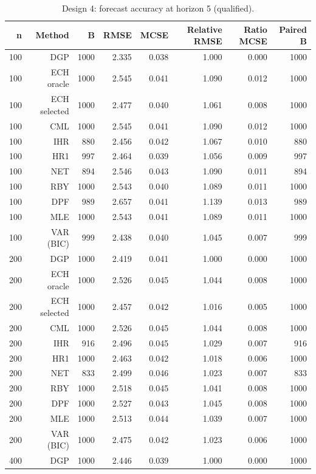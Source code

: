 \begin{table}[p]\centering
\caption{Design 4: forecast accuracy at horizon 5 (qualified).}
\small
\begin{tabular}{rrrrrrrr}\toprule
n & Method & B & RMSE & MCSE & Relative RMSE & Ratio MCSE & Paired B \\\midrule
100 & DGP & 1000 & 2.335 & 0.038 & 1.000 & 0.000 & 1000 \\
100 & ECH oracle & 1000 & 2.545 & 0.041 & 1.090 & 0.012 & 1000 \\
100 & ECH selected & 1000 & 2.477 & 0.040 & 1.061 & 0.008 & 1000 \\
100 & CML & 1000 & 2.545 & 0.041 & 1.090 & 0.012 & 1000 \\
100 & IHR &  880 & 2.456 & 0.042 & 1.067 & 0.010 &  880 \\
100 & HR1 &  997 & 2.464 & 0.039 & 1.056 & 0.009 &  997 \\
100 & NET &  894 & 2.546 & 0.043 & 1.090 & 0.011 &  894 \\
100 & RBY & 1000 & 2.543 & 0.040 & 1.089 & 0.011 & 1000 \\
100 & DPF &  989 & 2.657 & 0.041 & 1.139 & 0.013 &  989 \\
100 & MLE & 1000 & 2.543 & 0.041 & 1.089 & 0.011 & 1000 \\
100 & VAR (BIC) &  999 & 2.438 & 0.040 & 1.045 & 0.007 &  999 \\
200 & DGP & 1000 & 2.419 & 0.041 & 1.000 & 0.000 & 1000 \\
200 & ECH oracle & 1000 & 2.526 & 0.045 & 1.044 & 0.008 & 1000 \\
200 & ECH selected & 1000 & 2.457 & 0.042 & 1.016 & 0.005 & 1000 \\
200 & CML & 1000 & 2.526 & 0.045 & 1.044 & 0.008 & 1000 \\
200 & IHR &  916 & 2.496 & 0.045 & 1.029 & 0.007 &  916 \\
200 & HR1 & 1000 & 2.463 & 0.042 & 1.018 & 0.006 & 1000 \\
200 & NET &  833 & 2.499 & 0.046 & 1.023 & 0.007 &  833 \\
200 & RBY & 1000 & 2.518 & 0.045 & 1.041 & 0.008 & 1000 \\
200 & DPF & 1000 & 2.527 & 0.043 & 1.045 & 0.008 & 1000 \\
200 & MLE & 1000 & 2.513 & 0.044 & 1.039 & 0.007 & 1000 \\
200 & VAR (BIC) & 1000 & 2.475 & 0.042 & 1.023 & 0.006 & 1000 \\
400 & DGP & 1000 & 2.446 & 0.039 & 1.000 & 0.000 & 1000 \\

\end{tabular}
\end{table}
